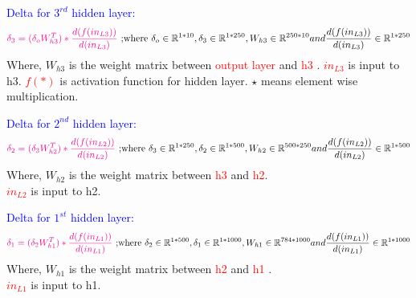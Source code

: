 \documentclass[12pt,a4paper]{article}
\newenvironment{QandA}{\begin{enumerate}[label=\bfseries\alph*.]\bfseries}
                      {\end{enumerate}}
\newenvironment{answered}{\par\normalfont}{}
\begin{document}
\begin{QandA}
\begin{answered}
         
         
 
         \textcolor{blue}{Delta for $3^{rd}$ hidden layer:\\}
         \begin{equation}
        \textcolor{magenta}{\delta_3=(\delta_{o}W_{h3}^T)*\frac{d(f(in_{L3}))}{d(in_{L3})}}
         \text{    ;where } \delta_o \in \mathbb{R}^{1*10}, \delta_3 \in \mathbb{R}^{1*250},W_{h3} \in \mathbb{R}^{250*10} and \frac{d(f(in_{L3}))}{d(in_{L3})} \in \mathbb{R}^{1*250}
         \end{equation}         
Where, $W_{h3}$ is the weight matrix between \textcolor{red}{output layer} and \textcolor{red}{h3}  . \textcolor{red}{$in_{L3}$} is input to h3. \textcolor{red}{$f(*)$} is activation function for hidden layer. $\star$ means element wise multiplication.
         
         \textcolor{blue}{Delta for $2^{nd}$ hidden layer:\\}
         \begin{equation}
         \textcolor{magenta}{\delta_2=(\delta_{3}W_{h2}^T)*\frac{d(f(in_{L2}))}{d(in_{L2})}}
         \text{    ;where } \delta_3 \in \mathbb{R}^{1*250}, \delta_2 \in \mathbb{R}^{1*500},W_{h2} \in \mathbb{R}^{500*250} and \frac{d(f(in_{L2}))}{d(in_{L2})} \in \mathbb{R}^{1*500}
         \end{equation} 
         Where, $W_{h2}$ is the weight matrix between \textcolor{red}{h3} and \textcolor{red}{h2}. \\  \textcolor{red}{$in_{L2}$} is input to h2.
         
         
         
         \textcolor{blue}{Delta for $1^{st}$ hidden layer:\\ }
          \begin{equation}
         \textcolor{magenta}{\delta_1=(\delta_{2}W_{h1}^T)*\frac{d(f(in_{L1}))}{d(in_{L1})}}
         \text{    ;where } \delta_2 \in \mathbb{R}^{1*500}, \delta_1 \in \mathbb{R}^{1*1000},W_{h1} \in \mathbb{R}^{784*1000} and \frac{d(f(in_{L1}))}{d(in_{L1})} \in \mathbb{R}^{1*1000}
         \end{equation} 
         Where, $W_{h1}$ is the weight matrix between \textcolor{red}{h2} and \textcolor{red}{h1}  .\\ \textcolor{red}{$in_{L1}$} is input to h1. 
        

\end{answered}
\end{QandA}
\end{document}
